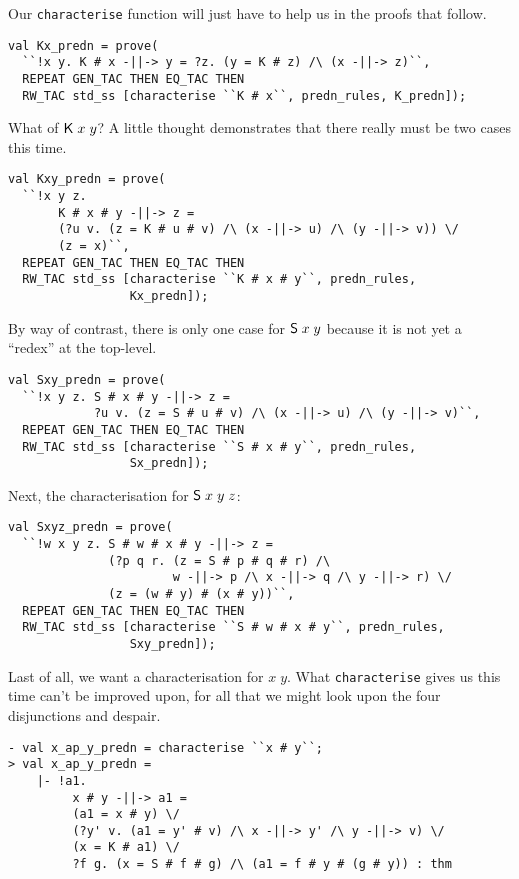 Our \texttt{characterise} function will just have to help us in the
proofs that follow.
\begin{session}
\begin{verbatim}
val Kx_predn = prove(
  ``!x y. K # x -||-> y = ?z. (y = K # z) /\ (x -||-> z)``,
  REPEAT GEN_TAC THEN EQ_TAC THEN
  RW_TAC std_ss [characterise ``K # x``, predn_rules, K_predn]);
\end{verbatim}
\end{session}
What of ${\sf K}\;x\;y$?  A little thought demonstrates that there really
must be two cases this time.
\begin{session}
\begin{verbatim}
val Kxy_predn = prove(
  ``!x y z.
       K # x # y -||-> z =
       (?u v. (z = K # u # v) /\ (x -||-> u) /\ (y -||-> v)) \/
       (z = x)``,
  REPEAT GEN_TAC THEN EQ_TAC THEN
  RW_TAC std_ss [characterise ``K # x # y``, predn_rules,
                 Kx_predn]);
\end{verbatim}
\end{session}
By way of contrast, there is only one case for ${\sf S}\;x\;y$ because it
is not yet a ``redex'' at the top-level.
\begin{session}
\begin{verbatim}
val Sxy_predn = prove(
  ``!x y z. S # x # y -||-> z =
            ?u v. (z = S # u # v) /\ (x -||-> u) /\ (y -||-> v)``,
  REPEAT GEN_TAC THEN EQ_TAC THEN
  RW_TAC std_ss [characterise ``S # x # y``, predn_rules,
                 Sx_predn]);
\end{verbatim}
\end{session}
Next, the characterisation for ${\sf S}\;x\;y\;z$:
\begin{session}
\begin{verbatim}
val Sxyz_predn = prove(
  ``!w x y z. S # w # x # y -||-> z =
              (?p q r. (z = S # p # q # r) /\
                       w -||-> p /\ x -||-> q /\ y -||-> r) \/
              (z = (w # y) # (x # y))``,
  REPEAT GEN_TAC THEN EQ_TAC THEN
  RW_TAC std_ss [characterise ``S # w # x # y``, predn_rules,
                 Sxy_predn]);
\end{verbatim}
\end{session}
Last of all, we want a characterisation for $x\;y$.   What
\texttt{characterise} gives us this time can't be improved upon,
for all that we might look upon the four disjunctions and despair.
\begin{session}
\begin{verbatim}
- val x_ap_y_predn = characterise ``x # y``;
> val x_ap_y_predn =
    |- !a1.
         x # y -||-> a1 =
         (a1 = x # y) \/
         (?y' v. (a1 = y' # v) /\ x -||-> y' /\ y -||-> v) \/
         (x = K # a1) \/
         ?f g. (x = S # f # g) /\ (a1 = f # y # (g # y)) : thm
\end{verbatim}
\end{session}
